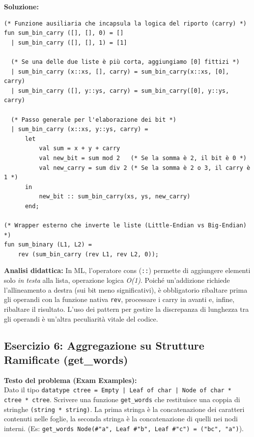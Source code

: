 \documentclass[12pt, a4paper]{article}
\begin{document}
\newpage

\textbf{Soluzione:}
\begin{verbatim}
(* Funzione ausiliaria che incapsula la logica del riporto (carry) *)
fun sum_bin_carry ([], [], 0) = []
  | sum_bin_carry ([], [], 1) = [1]
  
  (* Se una delle due liste è più corta, aggiungiamo [0] fittizi *)
  | sum_bin_carry (x::xs, [], carry) = sum_bin_carry(x::xs, [0], carry)
  | sum_bin_carry ([], y::ys, carry) = sum_bin_carry([0], y::ys, carry)
  
  (* Passo generale per l'elaborazione dei bit *)
  | sum_bin_carry (x::xs, y::ys, carry) =
      let
          val sum = x + y + carry
          val new_bit = sum mod 2   (* Se la somma è 2, il bit è 0 *)
          val new_carry = sum div 2 (* Se la somma è 2 o 3, il carry è 1 *)
      in
          new_bit :: sum_bin_carry(xs, ys, new_carry)
      end;

(* Wrapper esterno che inverte le liste (Little-Endian vs Big-Endian) *)
fun sum_binary (L1, L2) =
    rev (sum_bin_carry (rev L1, rev L2, 0));
\end{verbatim}
\textbf{Analisi didattica:} In ML, l'operatore cons (\texttt{::}) permette di aggiungere elementi solo \textit{in testa} alla lista, operazione logica \textit{O(1)}. Poiché un'addizione richiede l'allineamento a destra (sui bit meno significativi), è obbligatorio ribaltare prima gli operandi con la funzione nativa \texttt{rev}, processare i carry in avanti e, infine, ribaltare il risultato. L'uso dei pattern per gestire la discrepanza di lunghezza tra gli operandi è un'altra peculiarità vitale del codice.

\subsection{Esercizio 6: Aggregazione su Strutture Ramificate (get\_words)}

\textbf{Testo del problema (Exam Examples):}\\
Dato il tipo \texttt{datatype ctree = Empty | Leaf of char | Node of char * ctree * ctree}. Scrivere una funzione \texttt{get\_words} che restituisce una coppia di stringhe \texttt{(string * string)}. La prima stringa è la concatenazione dei caratteri contenuti nelle foglie, la seconda stringa è la concatenazione di quelli nei nodi interni.
(Es: \texttt{get\_words Node(\#"a", Leaf \#"b", Leaf \#"c") = ("bc", "a")}).

\newpage
\end{document}
